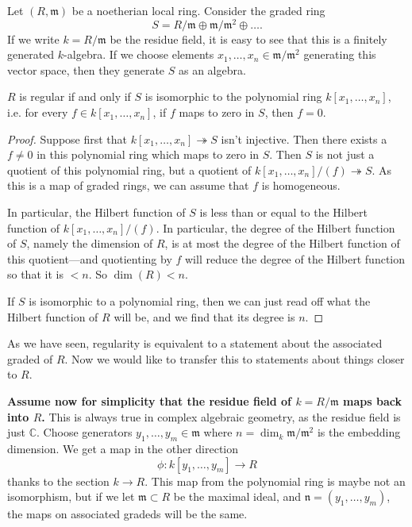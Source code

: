 Let $(R, \mathfrak{m})$ be a noetherian  local ring. Consider the graded ring
\[ S = R/\mathfrak{m} \oplus \mathfrak{m}/\mathfrak{m}^2 \oplus \dots.  \]
If we write $k = R/\mathfrak{m}$ be the residue field, it is easy to see that this is a finitely
generated $k$-algebra. If we choose elements $x_1, \dots, x_n \in
\mathfrak{m}/\mathfrak{m}^2$ generating this vector space, then they generate
$S$ as an algebra. 

\begin{proposition} 
$R$ is regular if and only if $S$ is isomorphic to the polynomial ring $k[x_1,
\dots, x_n]$, i.e. for every $f \in k[x_1, \dots, x_n]$, if $f$ maps to zero
in $S$, then $f=0$.
\end{proposition} 
\begin{proof} 
Suppose first that $k[x_1, \dots, x_n] \twoheadrightarrow S$ isn't injective.
Then there exists a $f \neq 0$ in this polynomial ring which maps to zero in
$S$. Then $S$ is not just a quotient of this polynomial ring, but a quotient of
$k[x_1, \dots, x_n]/(f) \twoheadrightarrow S$. As this is a map of graded
rings, we can assume that $f$ is homogeneous. 

In particular, the Hilbert
function of $S$ is less than or equal to the Hilbert function of $k[x_1, \dots,
x_n]/(f)$. In particular, the degree of the Hilbert function of $S$, namely
the dimension of $R$, is at most
the degree of the Hilbert function of this quotient---and quotienting by $f$
will reduce the degree of the Hilbert function so that it is $<n$. So $\dim(R) <n$.

If $S$ is isomorphic to a polynomial ring, then we can just read off what the
Hilbert function of $R$ will be, and we find that its degree is $n$.
\end{proof} 

As we have seen, regularity is equivalent to a statement about the associated
graded of $R$. Now we would like to transfer this to statements about things
closer to $R$. 

\textbf{Assume now for simplicity that the residue field of $k=R/\mathfrak{m}$
maps back into $R$.} This is always true in complex algebraic geometry, as the
residue field is just $\mathbb{C}$. Choose generators $y_1, \dots, y_m \in
\mathfrak{m}$ where $n = \dim_k \mathfrak{m}/\mathfrak{m}^2$ is the embedding
dimension. We get a map in the other direction
\[ \phi:k[y_1, \dots, y_m] \to R  \]
thanks to the section $k \to R$. This map from the polynomial ring is maybe not
an isomorphism, but if we let $\mathfrak{m} \subset R$ be the maximal ideal,
and $\mathfrak{n} = (y_1, \dots, y_m)$, the maps on associated gradeds will be
the same.

